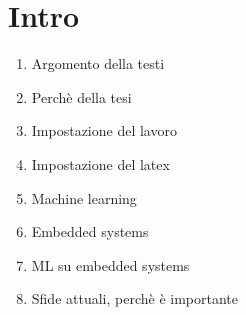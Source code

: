 
\chapter{Intro} 


\begin{enumerate}
  \item Argomento della testi
  \item Perchè della tesi
  \item Impostazione del lavoro
  \item Impostazione del latex
  \item Machine learning
  \item Embedded systems
  \item ML su embedded systems
  \item Sfide attuali, perchè è importante
\end{enumerate}




